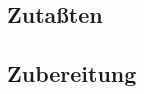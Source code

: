 \documentclass[fontsize=15pt,paper=a4]{scrdoc}
\begin{document}
\section*{}
\vspace{-15pt}
\subsection*{Zutaßten}
\begin{multicols}{2}
    \begin{itemize}[left=0pt, label={-}, itemsep=-0.15em]
        
    \end{itemize}
\end{multicols}
\subsection*{Zubereitung}
\begin{enumerate}[left=0pt]
    
\end{enumerate}
\end{document}
